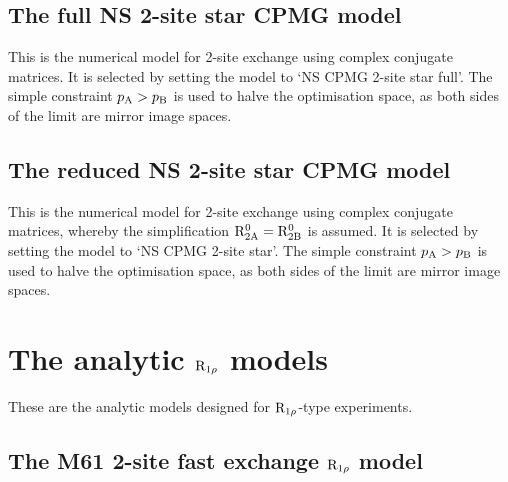 
\subsection{The full NS 2-site star CPMG model}
\label{sect: dispersion: NS CPMG 2-site star full model}

This is the numerical model for 2-site exchange using complex conjugate matrices.
It is selected by setting the model to `NS CPMG 2-site star full'.
The simple constraint $p_\textrm{A} > p_\textrm{B}$ is used to halve the optimisation space, as both sides of the limit are mirror image spaces.



\subsection{The reduced NS 2-site star CPMG model}
\label{sect: dispersion: NS CPMG 2-site star model}

This is the numerical model for 2-site exchange using complex conjugate matrices, whereby the simplification $\mathrm{R}_\mathrm{2A}^0 = \mathrm{R}_\mathrm{2B}^0$ is assumed.
It is selected by setting the model to `NS CPMG 2-site star'.
The simple constraint $p_\textrm{A} > p_\textrm{B}$ is used to halve the optimisation space, as both sides of the limit are mirror image spaces.




\section{The analytic $\mathrm{R}_{1\rho}$ models}
\label{sect: dispersion: analytic R1rho models}

These are the analytic models designed for $\mathrm{R}_{1\rho}$-type experiments.



\subsection{The M61 2-site fast exchange $\mathrm{R}_{1\rho}$ model}
\label{sect: dispersion: M61 model}

